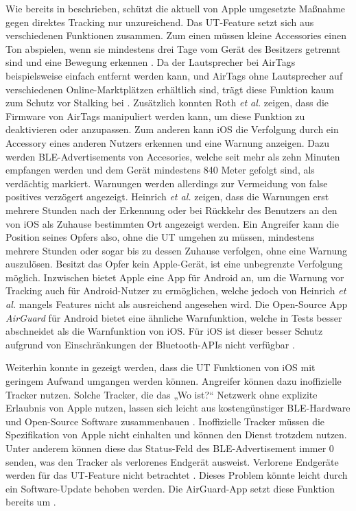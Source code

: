 Wie bereits in  beschrieben, schützt die aktuell von Apple umgesetzte Maßnahme gegen direktes Tracking nur unzureichend.
Das \ac{UT}-Feature setzt sich aus verschiedenen Funktionen zusammen.
Zum einen müssen kleine Accessories einen Ton abspielen, wenn sie mindestens drei Tage vom Gerät des Besitzers getrennt sind und eine Bewegung erkennen \cite{Apple_FindMySpec}.
Da der Lautsprecher bei AirTags beispielsweise einfach entfernt werden kann, und AirTags ohne Lautsprecher auf verschiedenen Online-Marktplätzen erhältlich sind, trägt diese Funktion kaum zum Schutz vor Stalking bei \cite{Heinrich_AirGuard}.
Zusätzlich konnten Roth \textit{et al.} \cite{Roth_airtags} zeigen, dass die Firmware von AirTags manipuliert werden kann, um diese Funktion zu deaktivieren oder anzupassen.
Zum anderen kann iOS die Verfolgung durch ein Accessory eines anderen Nutzers erkennen und eine Warnung anzeigen.
Dazu werden \ac{BLE}-Advertisements von Accesories, welche seit mehr als zehn Minuten empfangen werden und dem Gerät mindestens 840 Meter gefolgt sind, als verdächtig markiert.
Warnungen werden allerdings zur Vermeidung von false positives verzögert angezeigt.
Heinrich \textit{et al.} \cite{Heinrich_AirGuard} zeigen, dass die Warnungen erst mehrere Stunden nach der Erkennung oder bei Rückkehr des Benutzers an den von iOS als Zuhause bestimmten Ort angezeigt werden.
Ein Angreifer kann die Position seines Opfers also, ohne die \ac{UT} umgehen zu müssen, mindestens mehrere Stunden oder sogar bis zu dessen Zuhause verfolgen, ohne eine Warnung auszulösen.
Besitzt das Opfer kein Apple-Gerät, ist eine unbegrenzte Verfolgung möglich.
Inzwischen bietet Apple eine App für Android an, um die Warnung vor Tracking auch für Android-Nutzer zu ermöglichen, welche jedoch von Heinrich \textit{et al.} \cite{Heinrich_AirGuard} mangels Features nicht als ausreichend angesehen wird.
Die Open-Source App \textit{AirGuard} für Android bietet eine ähnliche Warnfunktion, welche in Tests besser abschneidet als die Warnfunktion von iOS.
Für iOS ist dieser besser Schutz aufgrund von Einschränkungen der Bluetooth-\acp{API} nicht verfügbar \cite{Heinrich_AirGuard}.

Weiterhin konnte in \cite{Heinrich_AirGuard,Mayberry_Tracking} gezeigt werden, dass die \ac{UT} Funktionen von iOS mit geringem Aufwand umgangen werden können.
Angreifer können dazu inoffizielle Tracker nutzen.
Solche Tracker, die das „Wo ist?“ Netzwerk ohne explizite Erlaubnis von Apple nutzen, lassen sich leicht aus kostengünstiger \ac{BLE}-Hardware und Open-Source Software zusammenbauen \cite{Heinrich,Heinrich_OpenHaystack,Mayberry_Tracking,Heinrich_AirGuard}.
Inoffizielle Tracker müssen die Spezifikation von Apple nicht einhalten und können den Dienst trotzdem nutzen.
Unter anderem können diese das Status-Feld des \ac{BLE}-Advertisement immer 0 senden, was den Tracker als verlorenes Endgerät ausweist.
Verlorene Endgeräte werden für das \ac{UT}-Feature nicht betrachtet \cite{Heinrich_AirGuard,Mayberry_Tracking}.
Dieses Problem könnte leicht durch ein Software-Update behoben werden.
Die AirGuard-App setzt diese Funktion bereits um \cite{Heinrich_AirGuard}.

